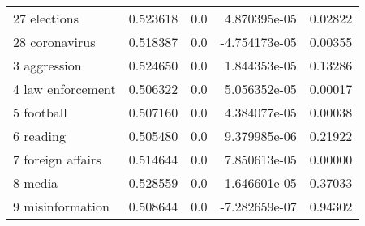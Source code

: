 \begin{tabular}{lrrrr}
27 elections               &  0.523618 &     0.0 &  4.870395e-05 &  0.02822 \\
28 coronavirus             &  0.518387 &     0.0 & -4.754173e-05 &  0.00355 \\
3 aggression               &  0.524650 &     0.0 &  1.844353e-05 &  0.13286 \\
4 law enforcement          &  0.506322 &     0.0 &  5.056352e-05 &  0.00017 \\
5 football                 &  0.507160 &     0.0 &  4.384077e-05 &  0.00038 \\
6 reading                  &  0.505480 &     0.0 &  9.379985e-06 &  0.21922 \\
7 foreign affairs          &  0.514644 &     0.0 &  7.850613e-05 &  0.00000 \\
8 media                    &  0.528559 &     0.0 &  1.646601e-05 &  0.37033 \\
9 misinformation           &  0.508644 &     0.0 & -7.282659e-07 &  0.94302 \\
\bottomrule
\end{tabular}
